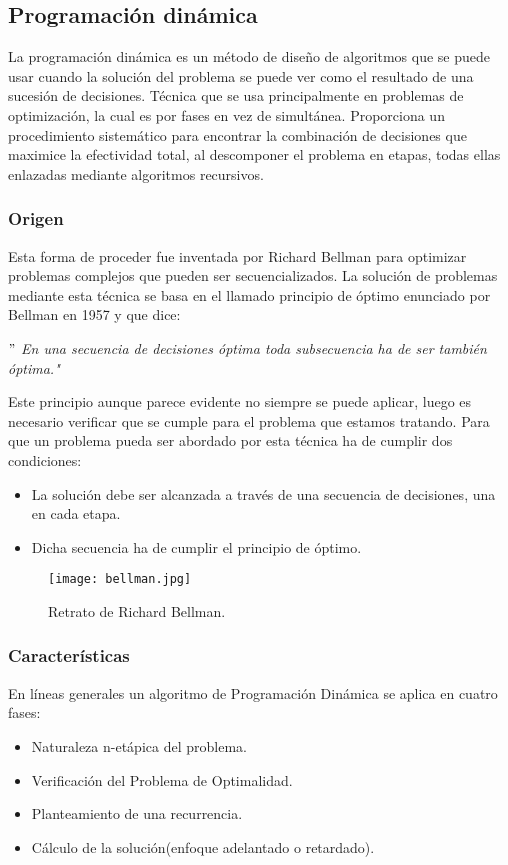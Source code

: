 \subsection{Programación dinámica}
La programación dinámica es un método de diseño de algoritmos que se puede usar cuando la solución del 
problema se puede ver como el resultado de una sucesión de decisiones. Técnica que se usa principalmente en
problemas de optimización, la cual es por fases en vez de simultánea.
Proporciona un procedimiento sistemático para encontrar la combinación de decisiones que maximice la efectividad
total, al descomponer el problema en etapas, todas ellas enlazadas mediante algoritmos recursivos.



\subsubsection{Origen}
Esta forma de proceder fue inventada por Richard Bellman para optimizar problemas complejos que pueden ser 
secuencializados. La solución de problemas mediante esta técnica se basa en el llamado principio de óptimo enunciado por 
Bellman en 1957 y que dice:
\begin{center}
    \emph{ $"$ En una secuencia de decisiones óptima toda subsecuencia ha de ser también óptima."}
\end{center}

Este principio aunque parece evidente no siempre se puede aplicar, luego es necesario verificar que se cumple para el problema
que estamos tratando. Para que un problema pueda ser abordado por esta técnica ha de cumplir dos condiciones:
\begin{itemize}
    \item La solución debe ser alcanzada a través de una secuencia de decisiones, una en cada etapa.
    \item Dicha secuencia ha de cumplir el principio de óptimo.
\end{itemize}

\begin{figure}[h]
    \centering
    \texttt{[image: bellman.jpg]}
    \caption{Retrato de Richard Bellman.}
\end{figure}

\subsubsection{Características}
En líneas generales un algoritmo de Programación Dinámica se aplica en cuatro fases:
\begin{itemize}
    \item Naturaleza n-etápica del problema.
    \item Verificación del Problema de Optimalidad.
    \item Planteamiento de una recurrencia.
    \item Cálculo de la solución(enfoque adelantado o retardado). 
\end{itemize}

